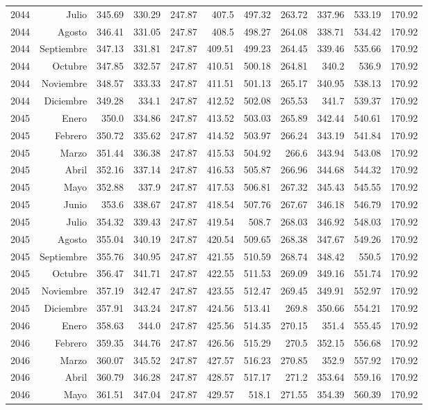 \documentclass{article}%
\begin{document}
\begin{longtable}{|l r|r|r|r|r|r|r|r|r|r|}
2044&Julio&345.69&330.29&247.87&407.5&497.32&263.72&337.96&533.19&170.92\\%
2044&Agosto&346.41&331.05&247.87&408.5&498.27&264.08&338.71&534.42&170.92\\%
2044&Septiembre&347.13&331.81&247.87&409.51&499.23&264.45&339.46&535.66&170.92\\%
2044&Octubre&347.85&332.57&247.87&410.51&500.18&264.81&340.2&536.9&170.92\\%
2044&Noviembre&348.57&333.33&247.87&411.51&501.13&265.17&340.95&538.13&170.92\\%
2044&Diciembre&349.28&334.1&247.87&412.52&502.08&265.53&341.7&539.37&170.92\\%
2045&Enero&350.0&334.86&247.87&413.52&503.03&265.89&342.44&540.61&170.92\\%
2045&Febrero&350.72&335.62&247.87&414.52&503.97&266.24&343.19&541.84&170.92\\%
2045&Marzo&351.44&336.38&247.87&415.53&504.92&266.6&343.94&543.08&170.92\\%
2045&Abril&352.16&337.14&247.87&416.53&505.87&266.96&344.68&544.32&170.92\\%
2045&Mayo&352.88&337.9&247.87&417.53&506.81&267.32&345.43&545.55&170.92\\%
2045&Junio&353.6&338.67&247.87&418.54&507.76&267.67&346.18&546.79&170.92\\%
2045&Julio&354.32&339.43&247.87&419.54&508.7&268.03&346.92&548.03&170.92\\%
2045&Agosto&355.04&340.19&247.87&420.54&509.65&268.38&347.67&549.26&170.92\\%
2045&Septiembre&355.76&340.95&247.87&421.55&510.59&268.74&348.42&550.5&170.92\\%
2045&Octubre&356.47&341.71&247.87&422.55&511.53&269.09&349.16&551.74&170.92\\%
2045&Noviembre&357.19&342.47&247.87&423.55&512.47&269.45&349.91&552.97&170.92\\%
2045&Diciembre&357.91&343.24&247.87&424.56&513.41&269.8&350.66&554.21&170.92\\%
2046&Enero&358.63&344.0&247.87&425.56&514.35&270.15&351.4&555.45&170.92\\%
2046&Febrero&359.35&344.76&247.87&426.56&515.29&270.5&352.15&556.68&170.92\\%
2046&Marzo&360.07&345.52&247.87&427.57&516.23&270.85&352.9&557.92&170.92\\%
2046&Abril&360.79&346.28&247.87&428.57&517.17&271.2&353.64&559.16&170.92\\%
2046&Mayo&361.51&347.04&247.87&429.57&518.1&271.55&354.39&560.39&170.92\\%

\end{longtable}
\end{document}
